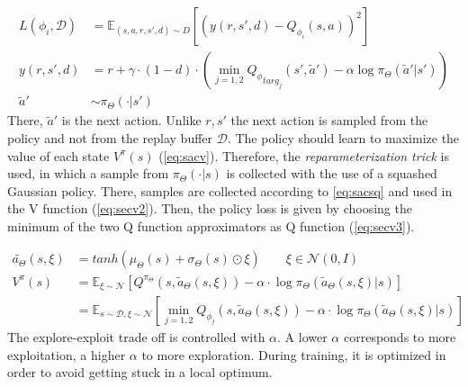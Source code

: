 \begin{align}
	L(\phi_i, \mathcal{D}) &= \mathbb{E}_{(s, a, r, s',d) \sim D} [(y(r,s',d) - Q_{\phi_i}(s,a))^2] \label{eq:sacloss}\\
	y(r,s',d) &= r + \gamma \cdot (1-d) \cdot
	(
	\min_{j=1,2} 
	{{}Q_\phi}_{targ_j}
	(s', \tilde{a}') - \alpha \log 
	\pi_{\Theta} (\tilde{a}'|s') )\label{eq:sactarget}\\
	\tilde{a}' &\sim \pi_{\Theta}(\cdot | s') \nonumber
 \end{align}
 There, $\tilde{a}'$ is the next action. Unlike $r,s'$ the next action is sampled from the policy and not from the replay buffer $\mathcal{D}$.
 \newpage
 The policy should learn to maximize the value of each state $V^{\pi} (s)$ (\cref{eq:sacv}). 
 Therefore, the \emph{reparameterization trick} is used, in which a sample from $\pi_{\Theta}(\cdot | s)$ 
 is collected with the use of a squashed Gaussian policy. 
 There, samples are collected according to \cref{eq:sacsq} and used in the V function (\cref{eq:secv2}). 
 Then, the policy loss is given by choosing the minimum of the two Q function approximators as Q function (\cref{eq:secv3}).
 
 \begin{align}
 	\tilde{a_\Theta} (s, \xi) &= tanh(\mu_{\Theta}(s) + \sigma_{\Theta}(s) \odot \xi) \qquad \xi \in \mathcal{N}(0,I) \label{eq:sacsq}\\
 	V^{\pi} (s) &= \mathbb{E}_{\xi \sim \mathcal{N}} [Q^{\pi_\Theta} (s, \tilde{a}_\Theta(s, \xi)) - \alpha \cdot 
 	\log \pi_\Theta (\tilde{a}_\Theta(s, \xi)| s)
 	] \label{eq:secv2}\\
 	&= \mathbb{E}_{s \sim \mathcal{D}, \xi \sim \mathcal{N}} [\min_{j=1,2}
 	 Q_{\phi_j} (s, \tilde{a}_\Theta(s, \xi)) - \alpha \cdot 
 	\log \pi_\Theta (\tilde{a}_\Theta(s, \xi)| s)
 	] \label{eq:secv3}
 \end{align}
  The explore-exploit trade off is controlled with $\alpha$. 
  A lower $\alpha$ corresponds to more exploitation, a higher $\alpha$ to more exploration. 
  During training, it is optimized in order to avoid getting stuck in a local optimum.

